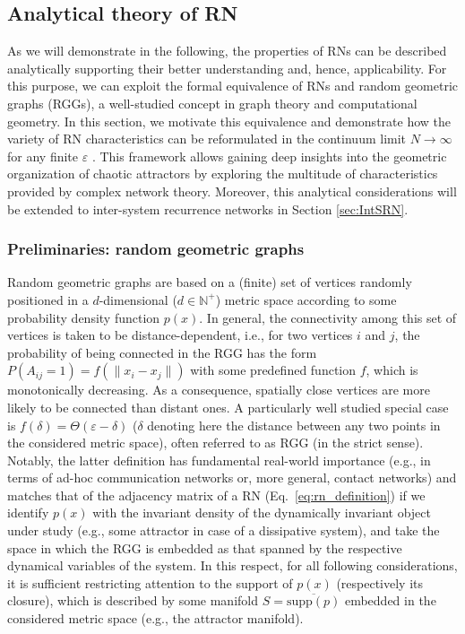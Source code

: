 	\subsection{Analytical theory of RN} \label{sec:analyticRNtheory}

	As we will demonstrate in the following, the properties of RNs can be described analytically supporting their better understanding and, hence, applicability. For this purpose, we can exploit the formal equivalence of RNs and random geometric graphs (RGGs), a well-studied concept in graph theory and computational geometry. In this section, we motivate this equivalence and demonstrate how the variety of RN characteristics can be reformulated in the continuum limit $N\to\infty$ for any finite $\varepsilon$ \cite{Donges2012}. This framework allows gaining deep insights into the geometric organization of chaotic attractors by exploring the multitude of characteristics provided by complex network theory. Moreover, this analytical considerations will be extended to inter-system recurrence networks in Section \ref{sec:IntSRN}. 


		\subsubsection{Preliminaries: random geometric graphs}
		Random geometric graphs \cite{Penrose2003} are based on a (finite) set of vertices randomly positioned in a $d$-dimensional ($d\in\mathbb{N}^+$) metric space according to some probability density function $p(x)$. In general, the connectivity among this set of vertices is taken to be distance-dependent, i.e., for two vertices $i$ and $j$, the probability of being connected in the RGG has the form $P(A_{ij}=1)=f(\|x_i-x_j\|)$ with some predefined function $f$, which is monotonically decreasing. As a consequence, spatially close vertices are more likely to be connected than distant ones. A particularly well studied special case is $f(\delta)=\Theta(\varepsilon-\delta)$ ($\delta$ denoting here the distance between any two points in the considered metric space), often referred to as RGG (in the strict sense). Notably, the latter definition has fundamental real-world importance (e.g., in terms of ad-hoc communication networks or, more general, contact networks) and matches that of the adjacency matrix of a RN (Eq.~\ref{eq:rn_definition}) if we identify $p(x)$ with the invariant density of the dynamically invariant object under study (e.g., some attractor in case of a dissipative system), and take the space in which the RGG is embedded as that spanned by the respective dynamical variables of the system. In this respect, for all following considerations, it is sufficient restricting attention to the support of $p(x)$ (respectively its closure), which is described by some manifold $S=\overline{\mbox{supp}(p)}$ embedded in the considered metric space (e.g., the attractor manifold).

